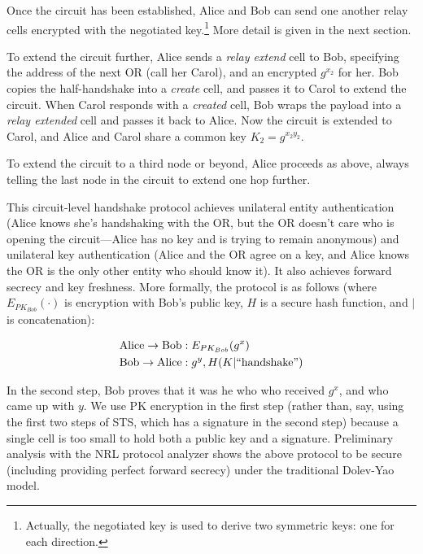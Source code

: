\documentclass[times,10pt,twocolumn]{article}
\begin{document}
Once the circuit has been established, Alice and Bob can send one
another relay cells encrypted with the negotiated
key.\footnote{Actually, the negotiated key is used to derive two
  symmetric keys: one for each direction.}  More detail is given in
the next section.

To extend the circuit further, Alice sends a \emph{relay extend} cell
to Bob, specifying the address of the next OR (call her Carol), and
an encrypted $g^{x_2}$ for her.  Bob copies the half-handshake into a
\emph{create} cell, and passes it to Carol to extend the circuit.
When Carol responds with a \emph{created} cell, Bob wraps the payload
into a \emph{relay extended} cell and passes it back to Alice.  Now
the circuit is extended to Carol, and Alice and Carol share a common key
$K_2 = g^{x_2 y_2}$.

To extend the circuit to a third node or beyond, Alice
proceeds as above, always telling the last node in the circuit to
extend one hop further.

This circuit-level handshake protocol achieves unilateral entity
authentication (Alice knows she's handshaking with the OR, but
the OR doesn't care who is opening the circuit---Alice has no key
and is trying to remain anonymous) and unilateral key authentication
(Alice and the OR agree on a key, and Alice knows the OR is the
only other entity who should know it). It also achieves forward
secrecy and key freshness. More formally, the protocol is as follows
(where $E_{PK_{Bob}}(\cdot)$ is encryption with Bob's public key,
$H$ is a secure hash function, and $|$ is concatenation):

\begin{equation}
\begin{aligned}
\mathrm{Alice} \rightarrow \mathrm{Bob}&: E_{PK_{Bob}}(g^x) \\
\mathrm{Bob} \rightarrow \mathrm{Alice}&: g^y, H(K | \mathrm{``handshake"}) \\
\end{aligned}
\end{equation}

In the second step, Bob proves that it was he who who received $g^x$,
and who came up with $y$. We use PK encryption in the first step
(rather than, say, using the first two steps of STS, which has a
signature in the second step) because a single cell is too small to
hold both a public key and a signature. Preliminary analysis with the
NRL protocol analyzer \cite{meadows96} shows the above protocol to be
secure (including providing perfect forward secrecy) under the
traditional Dolev-Yao model.
\end{document}
